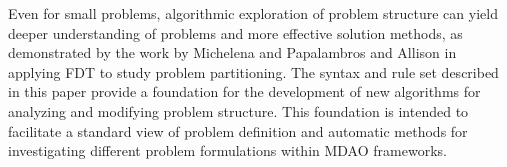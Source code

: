 Even for small problems, algorithmic exploration of problem structure can yield deeper understanding 
of problems and more effective solution methods, as demonstrated by the work by Michelena and Papalambros \cite{Michelena1997} and Allison \cite{Allison2008} in applying FDT to study problem partitioning. The syntax and rule set described 
in this paper
provide a foundation for the development of new algorithms for analyzing and modifying 
problem structure. This foundation is intended to facilitate a standard view of 
problem definition and automatic methods for investigating different  problem formulations within MDAO frameworks. 

